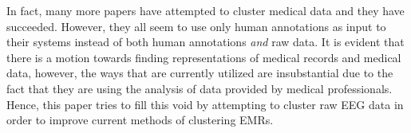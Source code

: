 In fact, many more papers have attempted to cluster medical data and they have succeeded. However, they all seem to use only human annotations as input to their systems instead of both human annotations \textit{and} raw data. It is evident that there is a motion towards finding representations of medical records and medical data, however, the ways that are currently utilized are insubstantial due to the fact that they are using the analysis of data provided by medical professionals. Hence, this paper tries to fill this void by attempting to cluster raw EEG data in order to improve current methods of clustering EMRs. 
